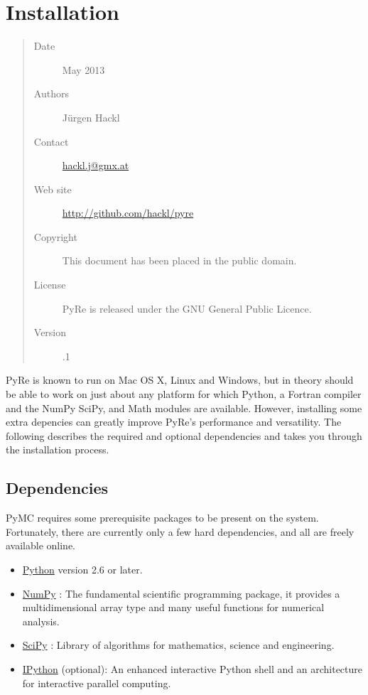 \documentclass[letterpaper,10pt,english]{sphinxmanual}
\begin{document}
\chapter{Installation}
\label{install:installation}\label{install:ifma}\label{install::doc}\begin{quote}\begin{description}
\item[{Date}]  May 2013

\item[{Authors}] \leavevmode
Jürgen Hackl

\item[{Contact}] \leavevmode
\href{mailto:hackl.j@gmx.at}{hackl.j@gmx.at}

\item[{Web site}] \leavevmode
\href{http://github.com/hackl/pyre}{http://github.com/hackl/pyre}

\item[{Copyright}] \leavevmode
This document has been placed in the public domain.

\item[{License}] \leavevmode
PyRe is released under the GNU General Public Licence.

\item[{Version}] .1

\end{description}\end{quote}

PyRe is known to run on Mac OS X, Linux and Windows, but in theory should be
able to work on just about any platform for which Python, a Fortran compiler
and the NumPy SciPy, and Math modules are available. However, installing some
extra depencies can greatly improve PyRe's performance and versatility. The
following describes the required and optional dependencies and takes you
through the installation process.


\section{Dependencies}
\label{install:dependencies}
PyMC requires some prerequisite packages to be present on the system.
Fortunately, there are currently only a few hard dependencies, and all are
freely available online.
\begin{itemize}
\item {} 
\href{http://www.python.org/.}{Python} version 2.6 or later.

\item {} 
\href{http://www.scipy.org/NumPy}{NumPy} : The fundamental scientific programming package, it
provides a multidimensional array type and many useful functions for
numerical analysis.

\item {} 
\href{http://www.scipy.org/}{SciPy} : Library of algorithms for mathematics, science and engineering.

\item {} 
\href{http://ipython.scipy.org/}{IPython} (optional): An enhanced interactive Python shell and an
architecture for interactive parallel computing.

\end{itemize}
\end{document}
